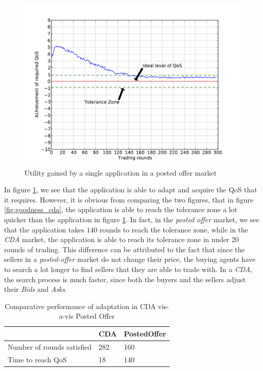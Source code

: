 \documentclass[10pt,journal,compsoc]{IEEEtran}
\begin{document}
\begin{figure}[h]
	\centering
	\includegraphics[scale=0.45]{graphs/posted_offer_singleapp_bimodal_qa.pdf}
	\caption{Utility gained by a single application in a posted offer market \label{fig:goodness_posted_offer}}
\end{figure}

In figure \ref{fig:goodness_posted_offer}, we see that the application is able to adapt and acquire the QoS that it requires. However, it is obvious from comparing the two figures, that in figure \ref{fig:goodness_cda}, the application is able to reach the tolerance zone a lot quicker than the application in figure \ref{fig:goodness_posted_offer}. In fact, in the \textit{posted offer} market, we see that the application takes $140$ rounds to reach the tolerance zone, while in the \textit{CDA} market, the application is able to reach its tolerance zone in under 20 rounds of trading. This difference can be attributed to the fact that since the sellers in a \textit{posted-offer} market do not change their price, the buying agents have to search a lot longer to find sellers that they are able to trade with. In a \textit{CDA}, the search process is much faster, since both the buyers and the sellers adjust their \textit{Bids} and \textit{Asks}.

\begin{table}[H]\footnotesize
\centering
\begin{tabular}{p{5cm}p{2cm}p{2cm}}
 \toprule
	& \textbf{CDA} & \textbf{PostedOffer} \\
 \midrule
	Number of rounds satisfied & 282 & 160 \\ 
	Time to reach QoS & 18 & 140 \\ 
\bottomrule
\end{tabular}
\caption{Comparative performance of adaptation in CDA vis-a-vis Posted Offer \label{tbl:comparative_performance}}
\end{table}
	
\end{document}
